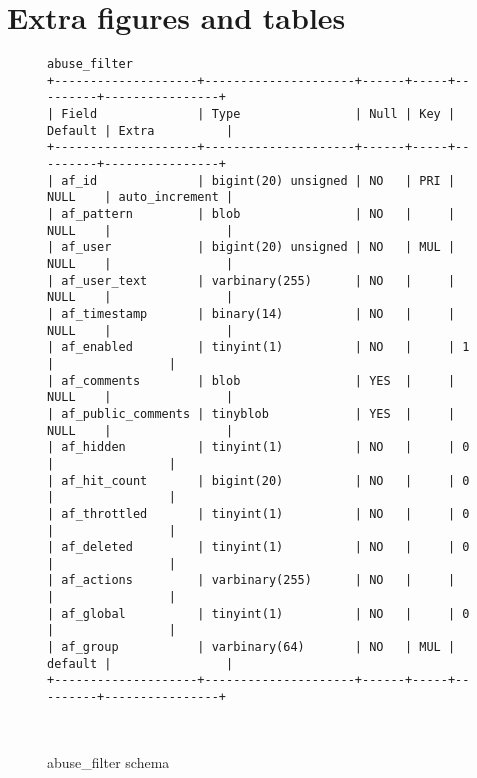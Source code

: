 \section{Extra figures and tables}
\label{app:appendix-figures}

\begin{figure*}
\begin{verbatim}
abuse_filter
+--------------------+---------------------+------+-----+---------+----------------+
| Field              | Type                | Null | Key | Default | Extra          |
+--------------------+---------------------+------+-----+---------+----------------+
| af_id              | bigint(20) unsigned | NO   | PRI | NULL    | auto_increment |
| af_pattern         | blob                | NO   |     | NULL    |                |
| af_user            | bigint(20) unsigned | NO   | MUL | NULL    |                |
| af_user_text       | varbinary(255)      | NO   |     | NULL    |                |
| af_timestamp       | binary(14)          | NO   |     | NULL    |                |
| af_enabled         | tinyint(1)          | NO   |     | 1       |                |
| af_comments        | blob                | YES  |     | NULL    |                |
| af_public_comments | tinyblob            | YES  |     | NULL    |                |
| af_hidden          | tinyint(1)          | NO   |     | 0       |                |
| af_hit_count       | bigint(20)          | NO   |     | 0       |                |
| af_throttled       | tinyint(1)          | NO   |     | 0       |                |
| af_deleted         | tinyint(1)          | NO   |     | 0       |                |
| af_actions         | varbinary(255)      | NO   |     |         |                |
| af_global          | tinyint(1)          | NO   |     | 0       |                |
| af_group           | varbinary(64)       | NO   | MUL | default |                |
+--------------------+---------------------+------+-----+---------+----------------+
\end{verbatim}
  \caption{abuse\_filter schema}~\label{fig:app-db-schemas-af}
\end{figure*}

